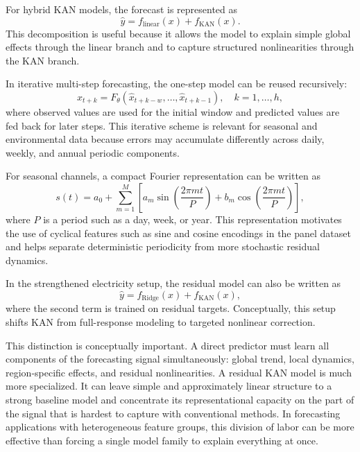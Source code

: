 \documentclass[10pt,conference,onecolumn]{IEEEtran}
\begin{document}
For hybrid KAN models, the forecast is represented as
\begin{equation}
\hat{y} = f_{\text{linear}}(x) + f_{\text{KAN}}(x).
\end{equation}
This decomposition is useful because it allows the model to explain simple global effects through the linear branch and to capture structured nonlinearities through the KAN branch.

In iterative multi-step forecasting, the one-step model can be reused recursively:
\begin{equation}
\hat{x}_{t+k} = F_{\theta}(\hat{x}_{t+k-w}, \ldots, \hat{x}_{t+k-1}), \quad k=1,\ldots,h,
\end{equation}
where observed values are used for the initial window and predicted values are fed back for later steps. This iterative scheme is relevant for seasonal and environmental data because errors may accumulate differently across daily, weekly, and annual periodic components.

For seasonal channels, a compact Fourier representation can be written as
\begin{equation}
s(t) = a_0 + \sum_{m=1}^{M} \left[
a_m \sin\left(\frac{2\pi m t}{P}\right) +
b_m \cos\left(\frac{2\pi m t}{P}\right)
\right],
\end{equation}
where $P$ is a period such as a day, week, or year. This representation motivates the use of cyclical features such as sine and cosine encodings in the panel dataset and helps separate deterministic periodicity from more stochastic residual dynamics.

In the strengthened electricity setup, the residual model can also be written as
\begin{equation}
\hat{y} = f_{\text{Ridge}}(x) + f_{\text{KAN}}(x),
\end{equation}
where the second term is trained on residual targets. Conceptually, this setup shifts KAN from full-response modeling to targeted nonlinear correction.

This distinction is conceptually important. A direct predictor must learn all components of the forecasting signal simultaneously: global trend, local dynamics, region-specific effects, and residual nonlinearities. A residual KAN model is much more specialized. It can leave simple and approximately linear structure to a strong baseline model and concentrate its representational capacity on the part of the signal that is hardest to capture with conventional methods. In forecasting applications with heterogeneous feature groups, this division of labor can be more effective than forcing a single model family to explain everything at once.
\end{document}
